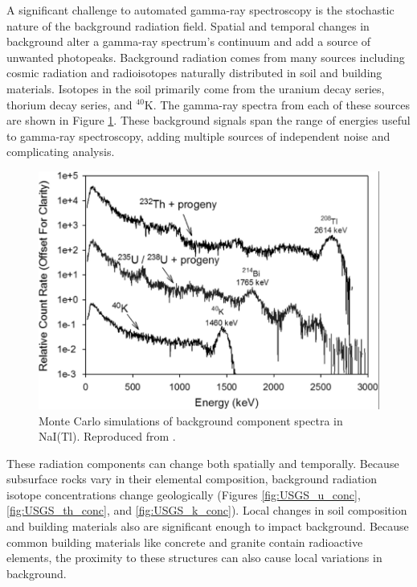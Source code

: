A significant challenge to automated gamma-ray spectroscopy is the stochastic nature of the background radiation field. 
Spatial and temporal changes in background alter a gamma-ray spectrum's continuum and add a source of unwanted photopeaks. Background radiation comes from many sources including cosmic radiation and radioisotopes naturally distributed in soil and building materials. Isotopes in the soil primarily come from the uranium decay series, thorium  decay series, and $^{40}$K. The gamma-ray spectra from each of these sources are shown in Figure \ref{fig:background_components}. These background signals span the range of energies useful to gamma-ray spectroscopy, adding multiple sources of independent noise and complicating analysis.

\begin{figure}[H]
\centering
\includegraphics[width=0.8\linewidth]{images/background_components}
\caption{Monte Carlo simulations of background component spectra in NaI(Tl). Reproduced from \cite{KULISEK2015}.}
\label{fig:background_components}
\end{figure}

These radiation components can change both spatially and temporally. Because subsurface rocks vary in their elemental composition, background radiation isotope concentrations change geologically (Figures \ref{fig:USGS_u_conc}, \ref{fig:USGS_th_conc}, and \ref{fig:USGS_k_conc}). Local changes in soil composition and building materials also are significant enough to impact background. Because common building materials like concrete and granite contain radioactive elements, the proximity to these structures can also cause local variations in background. 

